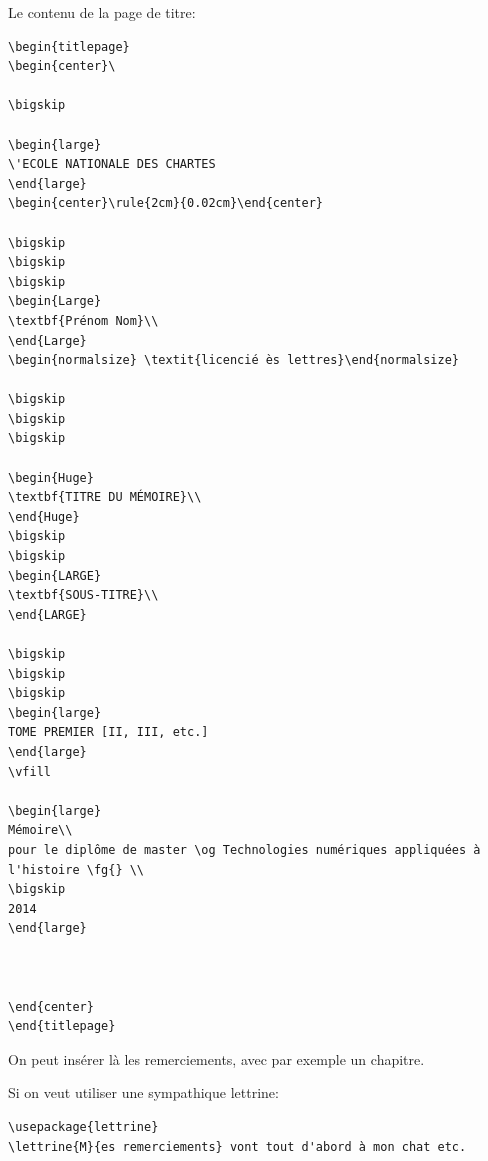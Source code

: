 \documentclass[a4paper,twoside,french,12pt]{article}
\begin{document}
Le contenu de la page de titre:
\begin{verbatim}
\begin{titlepage}
\begin{center}\

\bigskip

\begin{large}
\'ECOLE NATIONALE DES CHARTES
\end{large}
\begin{center}\rule{2cm}{0.02cm}\end{center}

\bigskip
\bigskip
\bigskip
\begin{Large}
\textbf{Prénom Nom}\\
\end{Large}
\begin{normalsize} \textit{licencié ès lettres}\end{normalsize}

\bigskip
\bigskip
\bigskip

\begin{Huge}
\textbf{TITRE DU MÉMOIRE}\\
\end{Huge}
\bigskip
\bigskip
\begin{LARGE}
\textbf{SOUS-TITRE}\\
\end{LARGE}

\bigskip
\bigskip
\bigskip
\begin{large}
TOME PREMIER [II, III, etc.]
\end{large}
\vfill

\begin{large}
Mémoire\\
pour le diplôme de master \og Technologies numériques appliquées à l'histoire \fg{} \\
\bigskip
2014
\end{large}



\end{center}
\end{titlepage}
\end{verbatim}


On peut insérer là les remerciements, avec par exemple un chapitre.

Si on veut utiliser une sympathique lettrine:
\begin{verbatim}
\usepackage{lettrine}
\lettrine{M}{es remerciements} vont tout d'abord à mon chat etc.
\end{verbatim}
\end{document}
